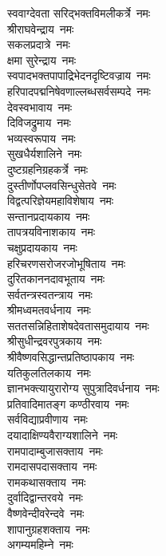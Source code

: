 \begin{flushleft}
\begin{multicols}{2}
स्ववाग्देवता सरिद्भक्तविमलीकर्त्रे~नमः\\
श्रीराघवेन्द्राय~नमः\\
सकलप्रदात्रे~नमः\\
क्षमा सुरेन्द्राय~नमः\\
स्वपादभक्तपापाद्रिभेदनदृष्टि\-वज्राय~नमः\\
हरिपादपद्मनिषेवणाल्लब्धसर्व\-सम्पदे~नमः\\
देवस्वभावाय~नमः\\
दिविजद्रुमाय~नमः\\
भव्यस्वरूपाय~नमः\\
सुखधैर्यशालिने~नमः\hfill{}\\
दुष्टग्रहनिग्रहकर्त्रे~नमः\\
दुस्तीर्णोपप्लवसिन्धुसेतवे~नमः\\
विद्वत्परिज्ञेयमहाविशेषाय~नमः\\
सन्तानप्रदायकाय~नमः\\
तापत्रयविनाशकाय~नमः\\
चक्षुप्रदायकाय~नमः\\
हरिचरणसरोजरजोभूषिताय~नमः\\
दुरितकाननदावभूताय~नमः\\
सर्वतन्त्रस्वतन्त्राय~नमः\\
श्रीमध्वमतवर्धनाय~नमः\hfill{}\\
सततसन्निहिताशेषदेवता\-समुदायाय~नमः\\
श्रीसुधीन्द्रवरपुत्रकाय~नमः\\
श्रीवैष्णवसिद्धान्त\-प्रतिष्ठा\-पकाय~नमः\\
यतिकुलतिलकाय~नमः\\
ज्ञानभक्त्यायुरारोग्य सुपुत्रादिवर्धनाय~नमः\\
प्रतिवादिमातङ्ग कण्ठीरवाय~नमः\\
सर्वविद्याप्रवीणाय~नमः\\
दयादाक्षिण्यवैराग्यशालिने~नमः\\
रामपादाम्बुजासक्ताय~नमः\\
रामदासपदासक्ताय~नमः\hfill{}\\
रामकथासक्ताय~नमः\\
दुर्वादिद्वान्तरवये~नमः\\
वैष्णवेन्दीवरेन्दवे~नमः\\
शापानुग्रहशक्ताय~नमः\\
अगम्यमहिम्ने~नमः\\

\end{multicols}
\end{flushleft}
